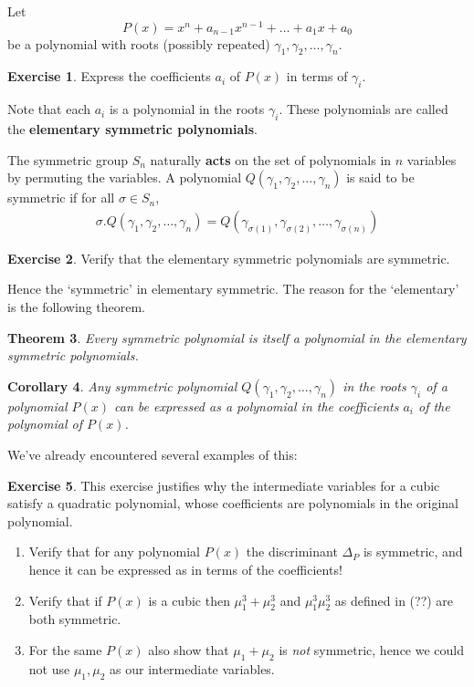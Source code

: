 \documentclass[reqno, 12pt, letter]{article}
\theoremstyle{plain}
\newtheorem{theorem}{Theorem}[section]
\newtheorem{corollary}[theorem]{Corollary}
\theoremstyle{definition}
\newtheorem{exercise}[theorem]{Exercise}
\theoremstyle{remark}
\numberwithin{equation}{section}
\begin{document}
	Let $$ P(x) = x^n + a_{n-1} x^{n-1} + \dots + a_1 x + a_0$$ be a polynomial with roots (possibly repeated) $ \gamma_1, \gamma_2, \dots, \gamma_n$.
	
	\begin{exercise}
		Express the coefficients $ a_i$ of $ P(x)$ in terms of $ \gamma_i$.
	\end{exercise}
	Note that each $ a_i$ is a polynomial in the roots $ \gamma_i$. These polynomials are called the \textbf{elementary symmetric polynomials}.

	The symmetric group $ S_n$ naturally \textbf{acts} on the set of polynomials in $ n$ variables by permuting the variables. A polynomial $Q(\gamma_1, \gamma_2, \dots, \gamma_n)$ is said to be symmetric if for all $\sigma \in S_n $, 
		\begin{align*}
			\sigma.Q(\gamma_1, \gamma_2, \dots, \gamma_n) = Q(\gamma_{\sigma(1)}, \gamma_{\sigma(2)}, \dots, \gamma_{\sigma(n)})
		\end{align*}
	
	\begin{exercise}
		Verify that the elementary symmetric polynomials are symmetric.
	\end{exercise}
	Hence the `symmetric' in elementary symmetric. The reason for the `elementary' is the following theorem.
	\begin{theorem}
		Every symmetric polynomial is itself a polynomial in the elementary symmetric polynomials.
	\end{theorem}
	\begin{corollary}
		Any symmetric polynomial $ Q(\gamma_1, \gamma_2, \dots, \gamma_n)$ in the roots $ \gamma_i$ of a polynomial $ P(x)$ can be expressed as a polynomial in the coefficients $ a_i$ of the polynomial of $ P(x)$.
	\end{corollary}
	
	We've already encountered several examples of this:
	\begin{exercise} This exercise justifies why the intermediate variables for a cubic satisfy a quadratic polynomial, whose coefficients are polynomials in the original polynomial.
		\begin{enumerate}
			\item Verify that for any polynomial $ P(x)$ the discriminant $ \Delta_P$ is symmetric, and hence it can be expressed as in terms of the coefficients!
			\item Verify that if $ P(x)$ is a cubic then $ \mu_1^3 + \mu_2^3 $ and $ \mu_1^3  \mu_2^3$ as defined in (??) are both symmetric. 
			\item For the same $ P(x)$ also show that $ \mu_1 + \mu_2$ is \emph{not} symmetric, hence we could not use $ \mu_1, \mu_2$ as our intermediate variables.
		\end{enumerate}
	\end{exercise}
	
\end{document}
